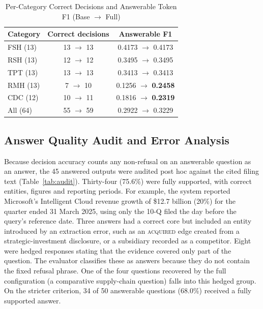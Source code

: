 \documentclass[conference]{IEEEtran}
\begin{document}
\begin{table}[t]
\caption{Per-Category Correct Decisions and Answerable Token F1 (Base $\rightarrow$ Full)}
\label{tab:category}
\centering
\footnotesize
\begin{tabular}{lcc}
\toprule
\textbf{Category} & \textbf{Correct decisions} & \textbf{Answerable F1}\\
\midrule
FSH (13) & 13 $\rightarrow$ 13 & 0.4173 $\rightarrow$ 0.4173\\
RSH (13) & 12 $\rightarrow$ 12 & 0.3495 $\rightarrow$ 0.3495\\
TPT (13) & 13 $\rightarrow$ 13 & 0.3413 $\rightarrow$ 0.3413\\
RMH (13) & \phantom{1}7 $\rightarrow$ 10 & 0.1256 $\rightarrow$ \textbf{0.2458}\\
CDC (12) & 10 $\rightarrow$ 11 & 0.1816 $\rightarrow$ \textbf{0.2319}\\
\midrule
All (64) & 55 $\rightarrow$ 59 & 0.2922 $\rightarrow$ 0.3229\\
\bottomrule
\end{tabular}
\end{table}



\subsection{Answer Quality Audit and Error Analysis}
Because decision accuracy counts any non-refusal on an answerable question as an answer, the 45 answered outputs were audited post hoc against the cited filing text (Table~\ref{tab:audit}). Thirty-four (75.6\%) were fully supported, with correct entities, figures and reporting periods. For example, the system reported Microsoft's Intelligent Cloud revenue growth of \$12.7 billion (20\%) for the quarter ended 31 March 2025, using only the 10-Q filed the day before the query's reference date. Three answers had a correct core but included an entity introduced by an extraction error, such as an \textsc{acquired} edge created from a strategic-investment disclosure, or a subsidiary recorded as a competitor. Eight were hedged responses stating that the evidence covered only part of the question. The evaluator classifies these as answers because they do not contain the fixed refusal phrase. One of the four questions recovered by the full configuration (a comparative supply-chain question) falls into this hedged group. On the stricter criterion, 34 of 50 answerable questions (68.0\%) received a fully supported answer.
\end{document}
